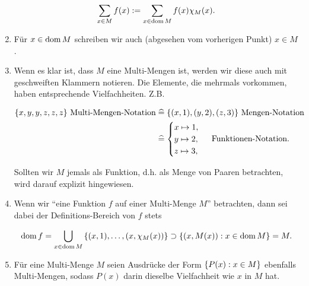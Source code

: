 \begin{enumerate}[label = \arabic*.]
                \begin{align*}
                    \sum_{x \in M} f(x)
                    :=
                    \sum_{x \in \operatorname{dom} M} f(x) \chi_M(x).
                \end{align*}

                \item Für $x \in \operatorname{dom} M$ schreiben wir auch (abgesehen vom vorherigen Punkt) $x \in M$.

                \item Wenn es klar ist, dass $M$ eine Multi-Mengen ist, werden wir diese auch mit geschweiften Klammern notieren.
                Die Elemente, die mehrmals vorkommen, haben entsprechende Vielfachheiten.
                Z.B.

                \begin{align*}
                    {\left \{ x, y, y, z, z, z \right \}}
                    ~ \text{Multi-Mengen-Notation}
                    & \mathrel{\widehat =}
                    {\left \{ (x, 1), (y, 2), (z, 3) \right \}}
                    ~ \text{Mengen-Notation} \\
                    & \mathrel{\widehat =}
                    \begin{cases}
                        x \mapsto 1, \\
                        y \mapsto 2, \\
                        z \mapsto 3, \\
                    \end{cases}
                    ~ \text{Funktionen-Notation}.
                \end{align*}

                Sollten wir $M$ jemals als Funktion, d.h. als Menge von Paaren betrachten, wird darauf explizit hingewiesen.

                \item Wenn wir \enquote{eine Funktion $f$ auf einer Multi-Menge $M$} betrachten, dann sei dabei der Definitions-Bereich von $f$ stets

                \begin{align*}
                    \operatorname{dom} f
                    =
                    \bigcup_{x \in \operatorname{dom} M} {\left \{ (x, 1), \dots, (x, \chi_M(x)) \right \}}
                    \supset
                    {\left \{ (x, M(x)): x \in \operatorname{dom}M \right \}}
                    =
                    M.
                \end{align*}

                \item Für eine Multi-Menge $M$ seien Ausdrücke der Form ${\left \{ P(x): x \in M \right \}}$ ebenfalls Multi-Mengen, sodass $P(x)$ darin dieselbe Vielfachheit wie $x$ in $M$ hat.

            \end{enumerate}

